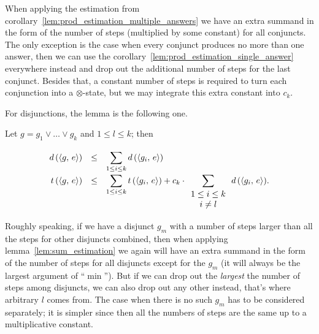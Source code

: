 When applying the estimation from corollary~\ref{lem:prod_estimation_multiple_answers} we have an extra summand in the form of the number of steps (multiplied by some constant) for all conjuncts.
The only exception is the case when every conjunct produces no more than one answer, then we can use the corollary~\ref{lem:prod_estimation_single_answer} everywhere instead and drop out the
additional number of steps for the last conjunct. Besides that, a constant number of steps is required to turn each conjunction into a $\otimes$-state, but we may integrate this extra constant into $c_k$.

For disjunctions, the lemma is the following one.

\begin{lemma}
\label{lem:disjunction_metrics_calc}

Let $g = g_1 \lor \dots \lor g_k$ and $1 \le l \le k$; then

\[
\renewcommand{\arraystretch}{1.5}
\begin{array}{rcl}
  d\,(\taskst{g}{e}) &\le& \displaystyle\sum\limits_{1 \le i \le k} d\,(\taskst{g_i}{e}) \\
  t\,(\taskst{g}{e}) &\le& \displaystyle\sum\limits_{1 \le i \le k} t\,(\taskst{g_i}{e}) + c_k\cdot \displaystyle\sum\limits_{\renewcommand{\arraystretch}{1}\begin{array}{c}1 \le i \le k \\ i \ne l\end{array}} d\,(\taskst{g_i}{e}).
\end{array}
\]

\end{lemma}

Roughly speaking, if we have a disjunct $g_m$ with a number of steps larger than all the steps for other disjuncts combined, then when applying lemma~\ref{lem:sum_estimation} we again will have an
extra summand in the form of the number of steps for all disjuncts except for the $g_m$ (it will always be the largest argument of ``$\min$''). But if we can drop out the \emph{largest}
the number of steps among disjuncts, we can also drop out any other instead, that's where arbitrary $l$ comes from. The case when there is no such $g_m$ has to be considered separately; it is simpler
since then all the numbers of steps are the same up to a multiplicative constant.
